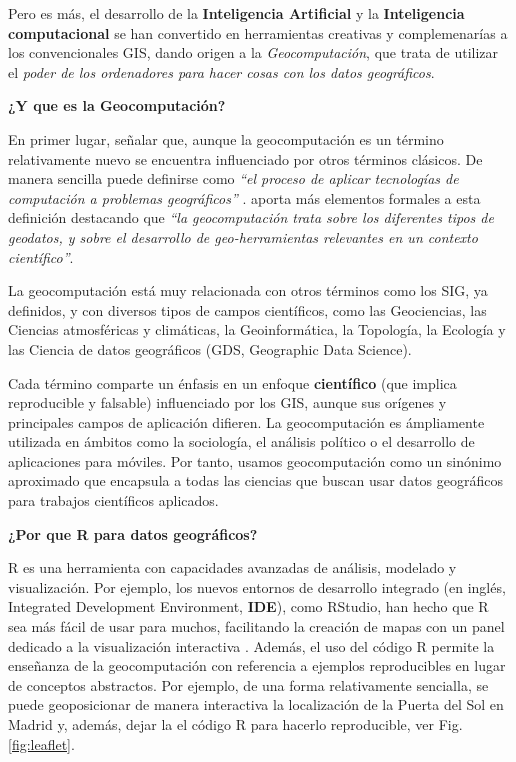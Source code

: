\documentclass[
]{book}
\begin{document}
Pero es más, el desarrollo de la \textbf{Inteligencia Artificial} y la \textbf{Inteligencia
computacional} se han convertido en herramientas creativas y complemenarías a
los convencionales GIS, dando origen a la \emph{Geocomputación}, que trata de
utilizar el \emph{poder de los ordenadores para hacer cosas con los datos
geográficos}.

\textbf{¿Y que es la Geocomputación?}

En primer lugar, señalar que, aunque la geocomputación es un término
relativamente nuevo se encuentra influenciado por otros términos clásicos. De
manera sencilla puede definirse como \emph{``el proceso de aplicar tecnologías de
computación a problemas geográficos''} \citep{rees1998}. \citet{Openshaw_Abrahart_2000}
aporta más elementos formales a esta definición destacando que \emph{``la
geocomputación trata sobre los diferentes tipos de geodatos, y sobre el
desarrollo de geo-herramientas relevantes en un contexto científico''}.

La geocomputación está muy relacionada con otros términos como los SIG, ya
definidos, y con diversos tipos de campos científicos, como las Geociencias, las
Ciencias atmosféricas y climáticas, la Geoinformática, la Topología, la Ecología
y las Ciencia de datos geográficos (GDS, Geographic Data Science).

Cada término comparte un énfasis en un enfoque \textbf{científico} (que implica
reproducible y falsable) influenciado por los GIS, aunque sus orígenes y
principales campos de aplicación difieren. La geocomputación es ámpliamente
utilizada en ámbitos como la sociología, el análisis político o el desarrollo de
aplicaciones para móviles. Por tanto, usamos geocomputación como un sinónimo
aproximado que encapsula a todas las ciencias que buscan usar datos geográficos
para trabajos científicos aplicados.

\textbf{¿Por que R para datos geográficos?}

R es una herramienta con capacidades avanzadas de análisis, modelado y
visualización. Por ejemplo, los nuevos entornos de desarrollo integrado (en
inglés, Integrated Development Environment, \textbf{IDE}), como RStudio, han hecho
que R sea más fácil de usar para muchos, facilitando la creación de mapas con un
panel dedicado a la visualización interactiva \citep{Lovelance_et_al_2019}. Además,
el uso del código R permite la enseñanza de la geocomputación con referencia a
ejemplos reproducibles en lugar de conceptos abstractos. Por ejemplo, de una
forma relativamente sencialla, se puede geoposicionar de manera interactiva la
localización de la Puerta del Sol en Madrid y, además, dejar la el código R para
hacerlo reproducible, ver Fig. \ref{fig:leaflet}.
\end{document}
